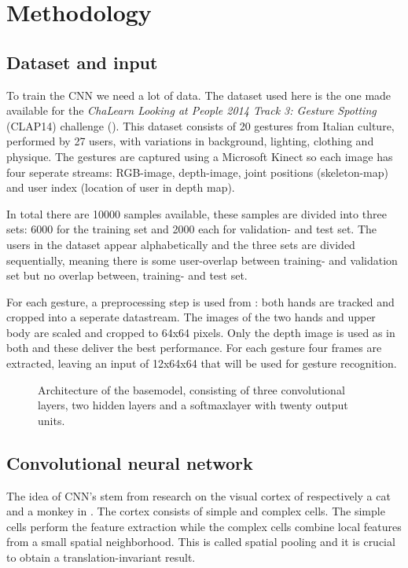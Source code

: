 \documentclass[twocolumn]{phdsymp} %
\begin{document}

\section{Methodology}
\subsection{Dataset and input}
To train the CNN we need a lot of data. The dataset used here is the one made available for the \textit{ChaLearn Looking at People 2014 Track 3: Gesture Spotting} (CLAP14) challenge (\cite{escalera_chalearn_2014}). This dataset consists of 20 gestures from Italian culture, performed by 27 users, with variations in background, lighting, clothing and physique. The gestures are captured using a Microsoft Kinect \cite{kuhn2011kinect} so each image has four seperate streams: RGB-image, depth-image, joint positions (skeleton-map) and user index (location of user in depth map).

In total there are 10000 samples available, these samples are divided into three sets: 6000 for the training set and 2000 each for validation- and test set. The users in the dataset appear alphabetically and the three sets are divided sequentially, meaning there is some user-overlap between training- and validation set but no overlap between, training- and test set.

For each gesture, a preprocessing step is used from \cite{lionel}: both hands are tracked and cropped into a seperate datastream. The images of the two hands and upper body are scaled and cropped to 64x64 pixels. Only the depth image is used as in both \cite{wu_deep_2014} and \cite{lionel} these deliver the best performance. For each gesture four frames are extracted, leaving an input of 12x64x64 that will be used for gesture recognition.
\begin{figure}
	\def\svgwidth{\textwidth}
	
	\caption{Architecture of the basemodel, consisting of three convolutional layers, two hidden layers and a softmaxlayer with twenty output units.}\label{fig:model}
\end{figure}
\subsection{Convolutional neural network}
The idea of CNN's stem from research on the visual cortex of respectively a cat and a monkey in \cite{hubel1968receptive}. The cortex consists of simple and complex cells. The simple cells perform the feature extraction while the complex cells combine local features from a small spatial neighborhood. This is called spatial pooling and it is crucial to obtain a translation-invariant result.
\end{document}
